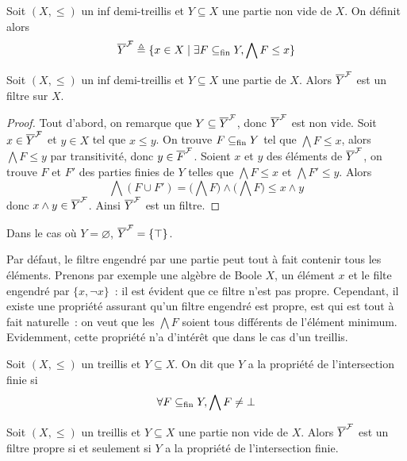 \begin{definition}
  Soit $(X,\leq)$ un inf demi-treillis et $Y\subseteq X$ une partie non vide de
  $X$. On définit alors
  \[\overline{Y}^{\mathcal F} \triangleq \{x\in X \mid \exists F\subseteq_{\mathrm{fin}} Y, \bigwedge F \leq x\}\]
\end{definition}

\begin{proposition}
  Soit $(X,\leq)$ un inf demi-treillis et $Y\subseteq X$ une partie de $X$.
  Alors $\overline{Y}^{\mathcal F}$ est un filtre sur $X$.
\end{proposition}

\begin{proof}
  Tout d'abord, on remarque que $Y\subseteq \overline{Y}^{\mathcal F}$, donc $\overline{Y}^{\mathcal F}$ est
  non vide. Soit $x\in \overline{Y}^{\mathcal F}$ et $y\in X$ tel que $x\leq y$. On trouve
  $F\subseteq_{\mathrm{fin}} Y$ tel que $\bigwedge F\leq x$, alors $\bigwedge F \leq y$ par
  transitivité, donc $y\in \overline{F}^{\mathcal F}$. Soient $x$ et $y$ des éléments de
  $\overline{Y}^{\mathcal F}$, on trouve $F$ et $F'$ des parties finies de $Y$ telles que
  $\bigwedge F \leq x$ et $\bigwedge F' \leq y$. Alors
  \[\bigwedge (F\cup F') = \Bigg(\bigwedge F\Bigg)\land\Bigg(\bigwedge F\Bigg)
  \leq x\land y\]
  donc $x\land y \in \overline{Y}^{\mathcal F}$. Ainsi $\overline{Y}^{\mathcal F}$ est un filtre.
\end{proof}

\begin{remark}
  Dans le cas où $Y = \varnothing$, $\overline{Y}^{\mathcal F} = \{\top\}$.
\end{remark}

Par défaut, le filtre engendré par une partie peut tout à fait contenir tous
les éléments. Prenons par exemple une algèbre de Boole $X$, un élément $x$ et le
filte engendré par $\{x,\lnot x\}$~: il est évident que ce filtre n'est pas
propre. Cependant, il existe une propriété assurant qu'un filtre engendré est
propre, est qui est tout à fait naturelle~: on veut que les $\bigwedge F$ soient
tous différents de l'élément minimum. Evidemment, cette propriété n'a d'intérêt
que dans le cas d'un treillis.

\begin{definition}
  Soit $(X,\leq)$ un treillis et $Y\subseteq X$. On dit que $Y$ a la propriété
  de l'intersection finie si
  \[\forall F\subseteq_{\mathrm{fin}} Y, \bigwedge F\neq \bot\]
\end{definition}

\begin{proposition}
  Soit $(X,\leq)$ un treillis et $Y\subseteq X$ une partie non vide de $X$.
  Alors $\overline{Y}^{\mathcal F}$ est un filtre propre si et seulement si $Y$ a la propriété
  de l'intersection finie.
\end{proposition}

